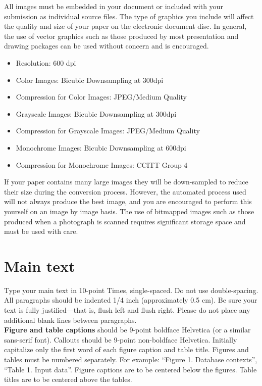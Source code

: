 \documentclass[10pt]{article}
\begin{document}
All images must be embedded in your document or included with your submission as individual source files. The type of graphics you include will affect the quality and size of your paper on the electronic document disc. In general, the use of vector graphics such as those produced by most presentation and drawing packages can be used without concern and is encouraged.

\begin{itemize}
    \item Resolution: 600 dpi
    \item Color Images: Bicubic Downsampling at 300dpi
    \item Compression for Color Images: JPEG/Medium Quality
    \item Grayscale Images: Bicubic Downsampling at 300dpi
    \item Compression for Grayscale Images: JPEG/Medium Quality
    \item Monochrome Images: Bicubic Downsampling at 600dpi
    \item Compression for Monochrome Images: CCITT Group 4
\end{itemize}

If your paper contains many large images they will be down-sampled to reduce their size during the conversion process.  However, the automated process used will not always produce the best image, and you are encouraged to perform this yourself on an image by image basis. The use of bitmapped images such as those produced when a photograph is scanned requires significant storage space and must be used with care.

\section{Main text}

Type your main text in 10-point Times, single-spaced. Do not use double-spacing. All paragraphs should be indented 1/4 inch (approximately 0.5 cm).  Be sure your text is fully justified—that is, flush left and flush right. Please do not place any additional blank lines between paragraphs. \\
\textbf{Figure and table captions} should be 9-point boldface Helvetica (or a similar sans-serif font).  Callouts should be 9-point non-boldface Helvetica. Initially capitalize only the first word of each figure caption and table title. Figures and tables must be numbered separately. For example: ``Figure 1. Database contexts'', ``Table 1. Input data''. Figure captions are to be centered below the figures. Table titles are to be centered above the tables.
\end{document}
